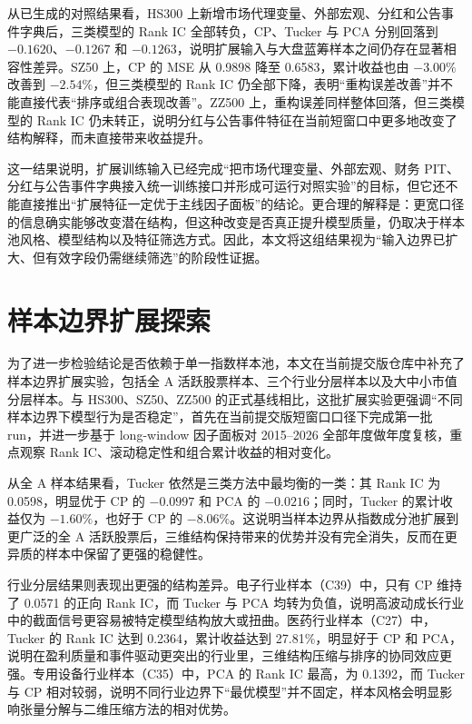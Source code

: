 从已生成的对照结果看，HS300 上新增市场代理变量、外部宏观、分红和公告事件字典后，三类模型的 Rank IC 全部转负，CP、Tucker 与 PCA 分别回落到 $-0.1620$、$-0.1267$ 和 $-0.1263$，说明扩展输入与大盘蓝筹样本之间仍存在显著相容性差异。SZ50 上，CP 的 MSE 从 0.9898 降至 0.6583，累计收益也由 $-3.00\%$ 改善到 $-2.54\%$，但三类模型的 Rank IC 仍全部下降，表明“重构误差改善”并不能直接代表“排序或组合表现改善”。ZZ500 上，重构误差同样整体回落，但三类模型的 Rank IC 仍未转正，说明分红与公告事件特征在当前短窗口中更多地改变了结构解释，而未直接带来收益提升。

这一结果说明，扩展训练输入已经完成“把市场代理变量、外部宏观、财务 PIT、分红与公告事件字典接入统一训练接口并形成可运行对照实验”的目标，但它还不能直接推出“扩展特征一定优于主线因子面板”的结论。更合理的解释是：更宽口径的信息确实能够改变潜在结构，但这种改变是否真正提升模型质量，仍取决于样本池风格、模型结构以及特征筛选方式。因此，本文将这组结果视为“输入边界已扩大、但有效字段仍需继续筛选”的阶段性证据。

\section{样本边界扩展探索}

为了进一步检验结论是否依赖于单一指数样本池，本文在当前提交版仓库中补充了样本边界扩展实验，包括全 A 活跃股票样本、三个行业分层样本以及大中小市值分层样本。与 HS300、SZ50、ZZ500 的正式基线相比，这批扩展实验更强调“不同样本边界下模型行为是否稳定”，首先在当前提交版短窗口口径下完成第一批 run，并进一步基于 long-window 因子面板对 2015--2026 全部年度做年度复核，重点观察 Rank IC、滚动稳定性和组合累计收益的相对变化。

从全 A 样本结果看，Tucker 依然是三类方法中最均衡的一类：其 Rank IC 为 0.0598，明显优于 CP 的 $-0.0997$ 和 PCA 的 $-0.0216$；同时，Tucker 的累计收益仅为 $-1.60\%$，也好于 CP 的 $-8.06\%$。这说明当样本边界从指数成分池扩展到更广泛的全 A 活跃股票后，三维结构保持带来的优势并没有完全消失，反而在更异质的样本中保留了更强的稳健性。

行业分层结果则表现出更强的结构差异。电子行业样本（C39）中，只有 CP 维持了 0.0571 的正向 Rank IC，而 Tucker 与 PCA 均转为负值，说明高波动成长行业中的截面信号更容易被特定模型结构放大或扭曲。医药行业样本（C27）中，Tucker 的 Rank IC 达到 0.2364，累计收益达到 27.81\%，明显好于 CP 和 PCA，说明在盈利质量和事件驱动更突出的行业里，三维结构压缩与排序的协同效应更强。专用设备行业样本（C35）中，PCA 的 Rank IC 最高，为 0.1392，而 Tucker 与 CP 相对较弱，说明不同行业边界下“最优模型”并不固定，样本风格会明显影响张量分解与二维压缩方法的相对优势。

